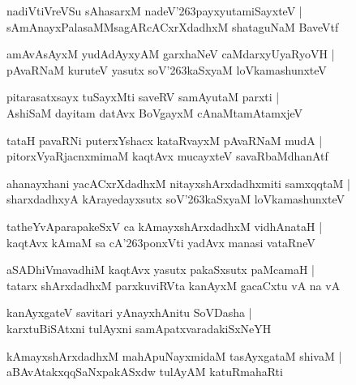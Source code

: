 \documentclass[twoside,12pt,openright]{book}
\def\S{\char'263}
\newcounter{shloka}[chapter]
\begin{document}
\begin{shloka}%
nadiVtiVreVSu sAhasarxM nadeV\S payxyutamiSayxteV |\\
sAmAnayxPalasaMMsagARcACxrXdadhxM shataguNaM BaveVtf
\end{shloka}

\begin{shloka}%
amAvAsAyxM yudAdAyxyAM garxhaNeV caMdarxyUyaRyoVH |\\
pAvaRNaM kuruteV yasutx soV\S kaSxyaM loVkamashunxteV 
\end{shloka}

\begin{shloka}%
pitarasatxsayx tuSayxMti saveRV samAyutaM parxti |\\
AshiSaM dayitam datAvx BoVgayxM cAnaMtamAtamxjeV 
\end{shloka}

\begin{shloka}%
tataH pavaRNi puterxYshacx kataRvayxM pAvaRNaM mudA |\\
pitorxVyaRjacnxmimaM kaqtAvx mucayxteV savaRbaMdhanAtf
\end{shloka}

\begin{shloka}%
ahanayxhani yacACxrXdadhxM nitayxshArxdadhxmiti samxqqtaM |\\
sharxdadhxyA kArayedayxsutx soV\S kaSxyaM loVkamashunxteV
\end{shloka}

\begin{shloka}%
tatheYvAparapakeSxV ca kAmayxshArxdadhxM vidhAnataH |\\
kaqtAvx kAmaM sa cA\S ponxVti yadAvx manasi vataRneV 
\end{shloka}

\begin{shloka}%
aSADhiVmavadhiM kaqtAvx yasutx pakaSxsutx paMcamaH |\\
tatarx shArxdadhxM parxkuviRVta kanAyxM gacaCxtu vA na vA 
\end{shloka}

\begin{shloka}%
kanAyxgateV savitari yAnayxhAnitu SoVDasha |\\
karxtuBiSAtxni tulAyxni samApatxvaradakiSxNeYH
\end{shloka}

\begin{shloka}%
kAmayxshArxdadhxM mahApuNayxmidaM tasAyxgataM shivaM |\\
aBAvAtakxqqSaNxpakASxdw tulAyAM katuRmahaRti
\end{shloka}
\end{document}

